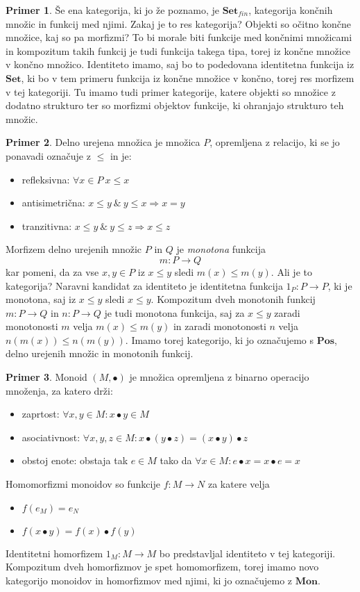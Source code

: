 \documentclass[12pt,a4paper]{book}
\theoremstyle{definition}
\theoremstyle{plain}
\theoremstyle{definition}
\newtheorem{primer}{Primer}[section]
\theoremstyle{remark}
\newcommand{\cat}[1]{\textbf{#1}}
\begin{document}
\begin{primer}
Še ena kategorija, ki jo že poznamo, je $\cat{Set}_{fin}$, kategorija končnih množic in funkcij med njimi. Zakaj je to res kategorija? Objekti so očitno končne množice, kaj so pa morfizmi? 
To bi morale biti funkcije med končnimi množicami in kompozitum takih funkcij je tudi funkcija takega tipa, torej iz končne množice v končno množico. Identiteto imamo, saj bo to podedovana identitetna funkcija iz $\cat{Set}$, ki bo v tem primeru funkcija iz končne množice v končno, torej res morfizem v tej kategoriji. Tu imamo tudi primer kategorije, katere objekti so množice z dodatno strukturo ter so morfizmi objektov funkcije, ki ohranjajo strukturo teh množic.
\end{primer}

\begin{primer}
Delno urejena množica je množica $P$, opremljena z relacijo, ki se jo ponavadi označuje z $\leq$ in je:
\begin{itemize}
\item refleksivna: $\forall x \in P \ x \leq x$
\item antisimetrična: $x \leq y \ \& \ y \leq x \Rightarrow x = y$
\item tranzitivna: $x \leq y \ \& \ y \leq z \Rightarrow x \leq z$
\end{itemize}
Morfizem delno urejenih množic $P$ in $Q$ je \emph{monotona} funkcija
$$m : P \to Q$$
kar pomeni, da za vse $x,y \in P$ iz $x \leq y$ sledi $m(x) \leq m(y)$. Ali je to kategorija? Naravni kandidat za identiteto je identitetna funkcija $1_P : P \to P$, ki je monotona, saj iz $x \leq y$ sledi $x \leq y$.
Kompozitum dveh monotonih funkcij $m : P \to Q$ in $n : P \to Q$ je tudi monotona funkcija, saj za $x \leq y$ zaradi monotonosti $m$ velja $m(x) \leq m(y)$ in zaradi monotonosti $n$ velja $n(m(x)) \leq n(m(y))$. Imamo torej kategorijo, ki jo označujemo s $\cat{Pos}$, delno urejenih množic in monotonih funkcij.
\end{primer}

\begin{primer}
Monoid $(M, \bullet)$ je množica opremljena z binarno operacijo množenja, za katero drži:
\begin{itemize}
\item zaprtost: $\forall x,y \in M : x \bullet y \in M$
\item asociativnost: $\forall x,y,z \in M : x \bullet ( y \bullet z ) = ( x \bullet y ) \bullet z$
\item obstoj enote: obstaja tak $e \in M$ tako da $\forall x \in M : e \bullet x = x \bullet e = x$
\end{itemize}
Homomorfizmi monoidov so funkcije $f : M \to N$ za katere velja
\begin{itemize}
\item $f(e_M) = e_N$
\item $f(x \bullet y) = f(x) \bullet f(y)$
\end{itemize}
Identitetni homorfizem $1_M : M \to M$ bo predstavljal identiteto v tej kategoriji. Kompozitum dveh homorfizmov je spet homomorfizem, torej imamo novo kategorijo monoidov in homorfizmov med njimi, ki jo označujemo z $\cat{Mon}$.
\end{primer}
\end{document}
